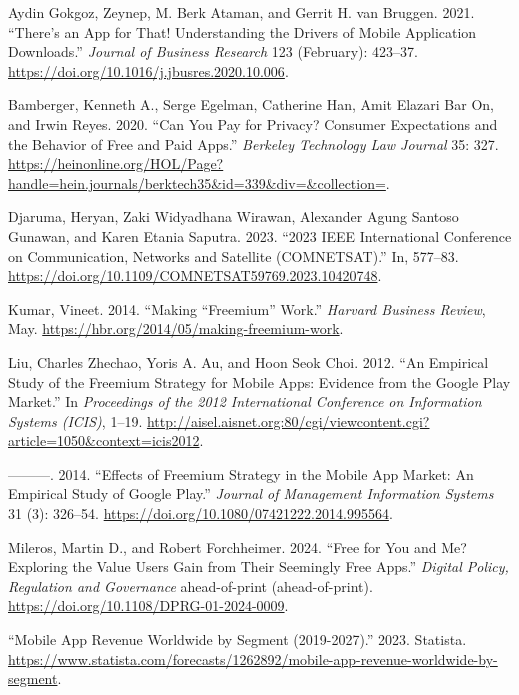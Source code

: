\documentclass[
  12pt,
  a4paper,
]{article}
\newlength{\cslhangindent}
\newenvironment{CSLReferences}[2] %
 {\begin{list}{}{%
  \setlength{\itemindent}{0pt}
  \setlength{\leftmargin}{0pt}
  \setlength{\parsep}{0pt}
  \ifodd #1
   \setlength{\leftmargin}{\cslhangindent}
   \setlength{\itemindent}{-1\cslhangindent}
  \fi
  \setlength{\itemsep}{#2\baselineskip}}}
 {\end{list}}
\begin{document}
\label{refs}
\begin{CSLReferences}{1}{0}
Aydin Gokgoz, Zeynep, M. Berk Ataman, and Gerrit H. van Bruggen. 2021.
{``There{'}s an App for That! Understanding the Drivers of Mobile
Application Downloads.''} \emph{Journal of Business Research} 123
(February): 423--37.
\url{https://doi.org/10.1016/j.jbusres.2020.10.006}.

Bamberger, Kenneth A., Serge Egelman, Catherine Han, Amit Elazari Bar
On, and Irwin Reyes. 2020. {``Can You Pay for Privacy? Consumer
Expectations and the Behavior of Free and Paid Apps.''} \emph{Berkeley
Technology Law Journal} 35: 327.
\url{https://heinonline.org/HOL/Page?handle=hein.journals/berktech35&id=339&div=&collection=}.

Djaruma, Heryan, Zaki Widyadhana Wirawan, Alexander Agung Santoso
Gunawan, and Karen Etania Saputra. 2023. {``2023 IEEE International
Conference on Communication, Networks and Satellite (COMNETSAT).''} In,
577--83. \url{https://doi.org/10.1109/COMNETSAT59769.2023.10420748}.

Kumar, Vineet. 2014. {``Making {``}Freemium{''} Work.''} \emph{Harvard
Business Review}, May.
\url{https://hbr.org/2014/05/making-freemium-work}.

Liu, Charles Zhechao, Yoris A. Au, and Hoon Seok Choi. 2012. {``An
Empirical Study of the Freemium Strategy for Mobile Apps: Evidence from
the Google Play Market.''} In \emph{Proceedings of the 2012
International Conference on Information Systems (ICIS)}, 1--19.
\url{http://aisel.aisnet.org:80/cgi/viewcontent.cgi?article=1050&context=icis2012}.

---------. 2014. {``Effects of Freemium Strategy in the Mobile App
Market: An Empirical Study of Google Play.''} \emph{Journal of
Management Information Systems} 31 (3): 326--54.
\url{https://doi.org/10.1080/07421222.2014.995564}.

Mileros, Martin D., and Robert Forchheimer. 2024. {``Free for You and
Me? Exploring the Value Users Gain from Their Seemingly Free Apps.''}
\emph{Digital Policy, Regulation and Governance} ahead-of-print
(ahead-of-print). \url{https://doi.org/10.1108/DPRG-01-2024-0009}.

{``Mobile App Revenue Worldwide by Segment (2019-2027).''} 2023.
Statista.
\url{https://www.statista.com/forecasts/1262892/mobile-app-revenue-worldwide-by-segment}.


\end{CSLReferences}
\end{document}
